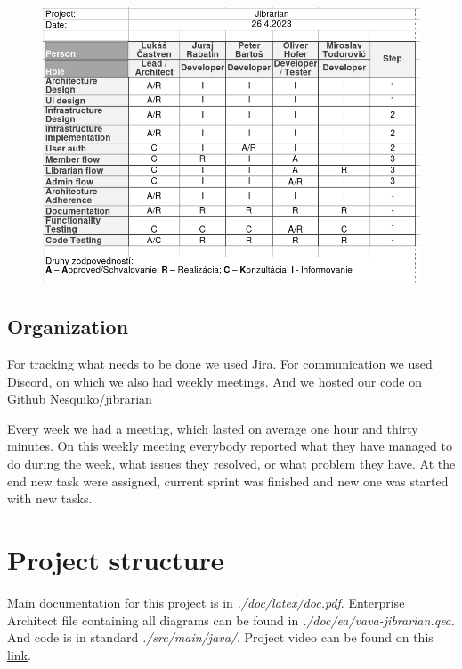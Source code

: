 \documentclass[11pt,twoside,a4paper]{article}
\begin{document}
\begin{figure}[!ht]
    \includegraphics[scale=.7]{../project-vision/RACI.png}
    \centering
\end{figure}

\subsection{Organization}

For tracking what needs to be done we used Jira. For communication we
used Discord, on which we also had weekly meetings. And we hosted our
code on Github Nesquiko/jibrarian \cite{githubGitHubNesquikojibrarian}

Every week we had a meeting, which lasted on average one hour and thirty minutes.
On this weekly meeting everybody reported what they have managed to do during the
week, what issues they resolved, or what problem they have. At the end new task
were assigned, current sprint was finished and new one was started with new tasks.


\section{Project structure}

Main documentation for this project is in \emph{./doc/latex/doc.pdf}. Enterprise
Architect file containing all diagrams can be found in \emph{./doc/ea/vava-jibrarian.qea}.
And code is in standard \emph{./src/main/java/}. Project video can be found on this
\href{https://drive.google.com/file/d/17OfZQXQFt6XRcCICxUjmQS1Mc4G9R32T/view?usp=share_link}{link}.
\end{document}
